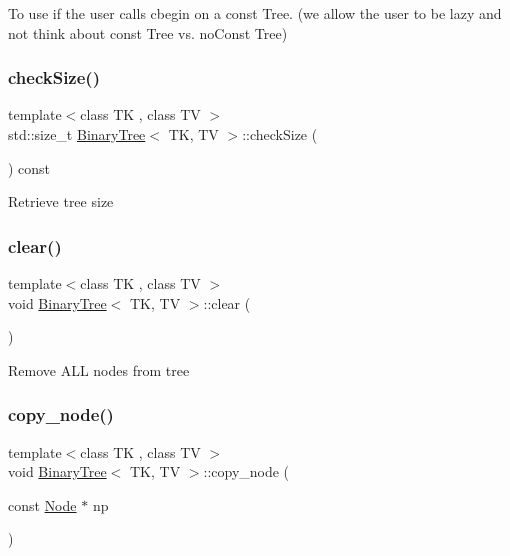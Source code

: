 To use if the user calls cbegin on a const Tree. (we allow the user to be lazy and not think about const Tree vs. no\+Const Tree) \mbox{\label{classBinaryTree_a8e35d6be680d9fbd5129361337ada338}} 
\subsubsection{\texorpdfstring{checkSize()}{checkSize()}}
{\footnotesize\ttfamily template$<$class TK , class TV $>$ \\
std\+::size\+\_\+t \mbox{\hyperlink{classBinaryTree}{Binary\+Tree}}$<$ TK, TV $>$\+::check\+Size (\begin{DoxyParamCaption}{ }\end{DoxyParamCaption}) const\hspace{0.3cm}{\ttfamily [inline]}}

Retrieve tree size \mbox{\label{classBinaryTree_a264446922f6d5fe75d4a41c650f88d6a}} 
\subsubsection{\texorpdfstring{clear()}{clear()}}
{\footnotesize\ttfamily template$<$class TK , class TV $>$ \\
void \mbox{\hyperlink{classBinaryTree}{Binary\+Tree}}$<$ TK, TV $>$\+::clear (\begin{DoxyParamCaption}{ }\end{DoxyParamCaption})\hspace{0.3cm}{\ttfamily [inline]}}

Remove A\+LL nodes from tree \mbox{\label{classBinaryTree_a01dfd4a677465fbc20923794e2363b44}} 
\subsubsection{\texorpdfstring{copy\_node()}{copy\_node()}}
{\footnotesize\ttfamily template$<$class TK , class TV $>$ \\
void \mbox{\hyperlink{classBinaryTree}{Binary\+Tree}}$<$ TK, TV $>$\+::copy\+\_\+node (\begin{DoxyParamCaption}\item[{const \mbox{\hyperlink{structBinaryTree_1_1Node}{Node}} $\ast$}]{np }\end{DoxyParamCaption})}

